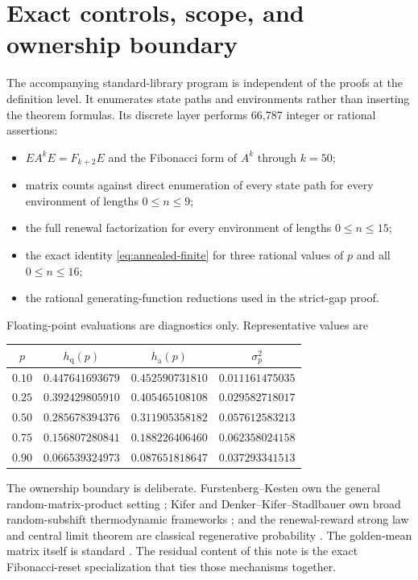 \documentclass[11pt,a4paper]{amsart}
\theoremstyle{definition}
\theoremstyle{remark}
\newcommand{\hq}{h_{\mathrm q}}
\newcommand{\ha}{h_{\mathrm a}}
\begin{document}
\section{Exact controls, scope, and ownership boundary}
\label{sec:controls}

The accompanying standard-library program is independent of the proofs at
the definition level.  It enumerates state paths and environments rather
than inserting the theorem formulas.  Its discrete layer performs 66,787
integer or rational assertions:
\begin{itemize}
\item $EA^kE=F_{k+2}E$ and the Fibonacci form of $A^k$ through $k=50$;
\item matrix counts against direct enumeration of every state path for every
      environment of lengths $0\leq n\leq9$;
\item the full renewal factorization for every environment of lengths
      $0\leq n\leq15$;
\item the exact identity \eqref{eq:annealed-finite} for three rational values
      of $p$ and all $0\leq n\leq16$;
\item the rational generating-function reductions used in the strict-gap
      proof.
\end{itemize}
Floating-point evaluations are diagnostics only.  Representative values are
\begin{center}
\begin{tabular}{@{}cccc@{}}
\toprule
$p$ & $\hq(p)$ & $\ha(p)$ & $\sigma_p^2$\\
\midrule
$0.10$ & $0.447641693679$ & $0.452590731810$ & $0.011161475035$\\
$0.25$ & $0.392429805910$ & $0.405465108108$ & $0.029582718017$\\
$0.50$ & $0.285678394376$ & $0.311905358182$ & $0.057612583213$\\
$0.75$ & $0.156807280841$ & $0.188226406460$ & $0.062358024158$\\
$0.90$ & $0.066539324973$ & $0.087651818647$ & $0.037293341513$\\
\bottomrule
\end{tabular}
\end{center}

The ownership boundary is deliberate.  Furstenberg--Kesten own the general
random-matrix-product setting \cite{FurstenbergKesten1960}; Kifer and
Denker--Kifer--Stadlbauer own broad random-subshift thermodynamic frameworks
\cite{Kifer2008,DenkerKiferStadlbauer2008}; and the renewal-reward strong law
and central limit theorem are classical regenerative probability
\cite{Asmussen2003}.  The golden-mean matrix itself is standard
\cite{LindMarcus1995}.  The residual content of this note is the exact
Fibonacci-reset specialization that ties those mechanisms together.
\end{document}
